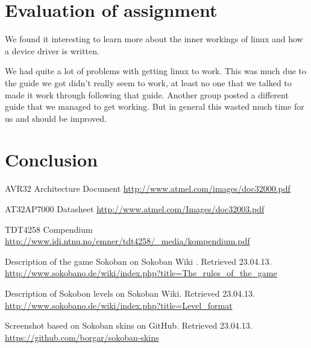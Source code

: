 \documentclass[a4paper,11pt]{article}
\begin{document}
\newpage

\section{Evaluation of assignment}

We found it interesting to learn more about the inner workings of linux and how a device driver is written. 

We had quite a lot of problems with getting linux to work. This was much due to the guide we got didn't really seem to work, at least no one that we talked to made it work through following that guide. Another group posted a different guide that we managed to get working. But in general this wasted much time for us and should be improved. 

\section{Conclusion}

\footnotesize{  %
\begin{thebibliography}{N}

 AVR32 Architecture Document
\url{http://www.atmel.com/images/doc32000.pdf}

 AT32AP7000 Datasheet
\url{http://www.atmel.com/Images/doc32003.pdf}

 TDT4258 Compendium
\url{http://www.idi.ntnu.no/emner/tdt4258/_media/kompendium.pdf}

 Description of the game Sokoban on Sokoban Wiki . Retrieved 23.04.13.
\url{http://www.sokobano.de/wiki/index.php?title=The_rules_of_the_game}

 Description of Sokobon levels on Sokoban Wiki. Retrieved 23.04.13.
\url{http://www.sokobano.de/wiki/index.php?title=Level_format}

 Screenshot based on Sokoban skins on GitHub. Retrieved 23.04.13.
\url{https://github.com/borgar/sokoban-skins}


\end{thebibliography}  
}
\end{document}
